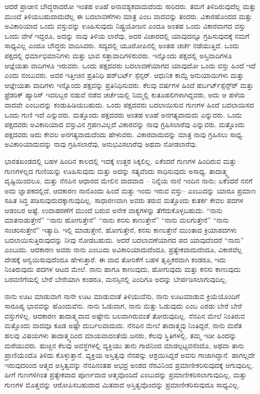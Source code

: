 ಆದರೆ ಪ್ರಾಚೀನ ಬೌದ್ಧರಾದರೋ ಇಂತಹ ಊಹೆ ಅನಾವಶ್ಯಕವಾದುದೆಂದು ಸಾರಿದರು. ತಮಗೆ ತಿಳಿದಿರುವುದೆಲ್ಲ ಮತ್ತು ಮುಂದೆ ತಿಳಿಯಬಹುದಾದುದೆಲ್ಲ ಈ ಬದಲಾವಣೆಗಳು ಮಾತ್ರ ಎಂಬ ವಾದವನ್ನು ತಂದರು. ವಿಕಾರಹೊಂದದ ಮತ್ತು ಅವಿಕಾರಿಯಾದ ಒಂದು ವಸ್ತುವನ್ನು ಊಹಿಸುವುದು ನಿಷ್ಟ್ರಯೋಜನ ಎಂದೂ ಅಂತಹ ಒಂದು ವಿಕಾರವಾಗದ ವಸ್ತು ಒಂದು ವೇಳೆ ಇದ್ದರೂ, ಅದನ್ನು ನಾವು ತಿಳಿಯ ಲಾರೆವು, ಅದರ ವಿಚಾರದಲ್ಲಿ ಯಾವುದನ್ನೂ ಗ್ರಹಿಸುವುದಕ್ಕೆ ನಮಗೆ ಸಾಧ್ಯವಿಲ್ಲ ಎಂದೂ ಬೌದ್ಧರು ವಾದಿಸಿದರು. ಸದ್ಯದಲ್ಲಿ ಯೂರೋಪಿನಲ್ಲಿ ಅಂತಹ ಚರ್ಚೆ ನಡೆಯುತ್ತಿದೆ. ಒಂದು ಪಕ್ಷದಲ್ಲಿ ಧರ್ಮಾಭಿಮಾನಿಗಳು ಮತ್ತು ಭಾವ ಸತ್ತಾವಾದಿಗಳಿರುವರು. ಇನ್ನೊಂದು ಪಕ್ಷದಲ್ಲಿ ಅಸ್ತಿವಾದಿಗಳೂ ಆಜ್ಞೆಯತಾ ವಾದಿಗಳೂ ಇರುವರು. ಒಂದು ಪಕ್ಷದವರು ಬದಲಾವಣೆಯಾಗದ ಯಾವುದೋ ಒಂದು ವಸ್ತು ಹಿಂದೆ ಇದೆ ಎಂದು ನಂಬುವರು. ಅವರ ಇತ್ತೀಚಿನ ಪ್ರತಿನಿಧಿ ಹರ್​ಬರ್ಟ್​ ಸ್ಪೆನ್ಸರ್​. ಆಧುನಿಕ ಕಾಮ್ಟೆ ಅನುಯಾಯಿಗಳು ಮತ್ತು ಆಜ್ಞೇಯತಾ ವಾದಿಗಳು ಇನ್ನೊಂದು ಪಕ್ಷವನ್ನು ಪ್ರತಿನಿಧಿಸುವರು. ಕೆಲವು ವರ್ಷಗಳ ಹಿಂದೆ ಹರ್ಬರ್ಟ್​ ಸ್ಪೆನ್ಸ್​ರ್​ ಮತ್ತು ಫ್ರೆಡರಿಕ್​ ಹ್ಯಾರಿಸ್​ ಇವರಿಬ್ಬರ ನಡುವೆ ನಡೆದ ಚರ್ಚೆಯಲ್ಲಿ ನಿಮ್ಮಲ್ಲಿ ಕುತೂಹಲಿಗಳಾಗಿದ್ದವರು, ಅದು ಆ ಹಳೆಯ ವಾದವೇ ಎಂಬುದನ್ನು ಕಂಡುಹಿಡಿಯಬಹುದು. ಒಂದು ಪಕ್ಷದವರು ಬದಲಾಯಿಸುವ ಗುಣಗಳ ಹಿಂದೆ ಬದಲಾಯಿಸದ ಒಂದು ಗುಣಿ ಇದೆ ಎನ್ನುವರು. ಮತ್ತೊಂದು ಪಕ್ಷದವರು ಅಂತಹ ಊಹೆ ಅನಗತ್ಯವಾದುದು ಎನ್ನುವರು. ಒಂದು ಪಕ್ಷದವರು ಅವಿಕಾರಿಯಾದ ವಸ್ತುವಿನ ಗ್ರಹಣವಿಲ್ಲದೆ ವಿಕಾರವನ್ನು ನಾವು ಗ್ರಹಿಸಲಾರೆವು ಎನ್ನುವರು. ಮತ್ತೊಂದು ಪಕ್ಷದವರು ಅದು ಕೇವಲ ಅನಗತ್ಯವಾದುದೆಂದು ಹೇಳುವರು. ವಿಕಾರವಾದುದನ್ನು ಮಾತ್ರ ನಾವು ಗ್ರಹಿಸಲು ಸಾಧ್ಯ. ಅವಿಕಾರಿಯಾದುದನ್ನು ನಾವು ಗ್ರಹಿಸಲಾರೆವು, ಅನುಭವಿಸಲಾರೆವು ಅಥವಾ ನೋಡಲಾರೆವು.

ಭಾರತಖಂಡದಲ್ಲಿ ಬಹಳ ಹಿಂದಿನ ಕಾಲದಲ್ಲಿ ಇದಕ್ಕೆ ಉತ್ತರ ಸಿಕ್ಕಲಿಲ್ಲ. ಏಕೆಂದರೆ ಗುಣಗಳ ಹಿಂದಿರುವ ಮತ್ತು ಗುಣಗಳಲ್ಲದ ಗುಣಿಯನ್ನು ಊಹಿಸುವುದು ಮತ್ತು ಅದನ್ನು ಸತ್ಯವೆಂದು ಸಾಧಿಸುವುದು ಅಸಾಧ್ಯ. ತಾದಾತ್ಮ್ಯ ದೃಷ್ಟಿಯಿಂದಲೂ, ಮತ್ತು ನೆನಪಿನ ಆಧಾರದ ಮೇಲಿನ ವಾದವಾದ – ನಿನ್ನೆಯ ನಾನೆ ಇಂದಿನ ನಾನು; ಏಕೆಂದರೆ ನನಗೆ ಅದು ಜ್ಞಾಪಕದಲ್ಲಿದೆ, ಆದಕಾರಣ ನಾನೊಂದು ಹಿಂದೆ ಮತ್ತು ಇಂದು ಇರುವ ವಸ್ತು– ಎಂಬುದನ್ನು ಯಾರೂ ಪ್ರಮಾಣ ಸಹಿತ ಸಿದ್ಧ ಪಡಿಸುವುದುದಕ್ಕಾಗುವುದಿಲ್ಲ. ಸಾಧಾರಣವಾಗಿ ಅವರು ತರುವ ಮತ್ತೊಂದು ಕುತರ್ಕ ಕೇವಲ ಪದಗಳ ಆಡಂಬರ ಅಷ್ಟೆ. ಉದಾಹರಣೆಗೆ ಮುಂದೆ ಬರುವ ಅನೇಕ ವಾಕ್ಯಗಳನ್ನು ತೆಗೆದುಕೊಳ್ಳಬಹುದು. “ನಾನು ಮಾತನಾಡುತ್ತೇನೆ” “ನಾನು ಹೋಗುತ್ತೇನೆ” “ನಾನು ಕನಸು ಕಾಣುತ್ತೇನೆ” “ನಾನು ಮಲಗುತ್ತೇನೆ” “ನಾನು ಸಂಚರಿಸುತ್ತೇನೆ” ಇತ್ಯಾದಿ. ಇಲ್ಲಿ ಮಾಡುತ್ತೇನೆ, ಹೋಗುತ್ತೇನೆ, ಕನಸು ಕಾಣುತ್ತೇನೆ ಮುಂತಾದ ಕ್ರಿಯಾಪದಗಳು ಬದಲಾಯಿಸುತ್ತಿರುವುದನ್ನು ನೀವು ನೋಡಬಹುದು. ಆದರೆ ಬದಲಾವಣೆಯಾಗದ ಪದ ಯಾವುದೆಂದರೆ “ನಾನು” ಎಂಬುದು. ಆದಕಾರಣ ಅವರು ನಾನು ಎಂಬುದು ಅವಿಕಾರಿಯಾದುದೆಂದೂ, ಪ್ರತ್ಯೇಕವಾದುದೆಂದೂ, ವಿಕಾರವೆಲ್ಲ ದೇಹಕ್ಕೆ ಅನ್ವಯಿಸುವುದೆಂದೂ ಹೇಳುತ್ತಾರೆ. ಈ ವಾದ ತೋರಿಕೆಗೆ ಬಹಳ ತೃಪ್ತಿಕರವಾಗಿ ಕಂಡರೂ, ಇದು ನಿಂತಿರುವುದು ಪದಗಳ ಆಟದ ಮೇಲೆ. ನಾನು ಹಾಗೂ ಕಾಣುವುದು, ಹೋಗುವುದು ಮತ್ತು ಕನಸು ಕಾಣುವುದು ಬರವಣಿಗೆಯಲ್ಲಿ ಬೇರೆ ಬೇರೆಯಾಗಿ ಕಂಡರೂ, ಮನಸ್ಸಿನಲ್ಲಿ ಎಂದಿಗೂ ಅದನ್ನು ಬೇರ್ಪಡಿಸಲಾಗುವುದಿಲ್ಲ.

ನಾನು ಊಟ ಮಾಡುವಾಗ ನಾನೇ ಊಟ ಮಾಡುವಂತೆ ತಿಳಿಯುವೆನು, ನಾನು ಊಟಮಾಡುವ ಕ್ರಿಯೆಯೊಂದಿಗೆ ಸಾರೂಪ್ಯ ಭಾವವನ್ನು ಹೊಂದುವೆನು. ನಾನು ಓಡುವಾಗ, ನಾನು ಮತ್ತು ಓಡುವುದು ಎಂಬ ಎರಡು ಬೇರೆ ಬೇರೆ ವಸ್ತುಗಳಿಲ್ಲ. ಆದಕಾರಣ ತಾದಾತ್ಮ್ಯವಾದ ಅಷ್ಟೇನು ಬಲವಾಗಿರುವಂತೆ ತೋರುವುದಿಲ್ಲ. ನೆನಪಿನ ಮೇಲೆ ನಿಂತಿರುವ ಮತ್ತೊಂದು ವಾದವೂ ಕೂಡ ಅಷ್ಟೇ ದುರ್ಬಲವಾದುದು. ನೆನಪಿನ ಮೇಲೆ ತಾದಾತ್ಮ್ಯವು ನಿಂತಿದ್ದರೆ, ನಾನು ಮರೆತ ಹಲವು ವಿಷಯಗಳು ತಾದಾತ್ಮ್ಯದಿಂದ ಮಾಯವಾದಂತೆಯೆ.ಜನರು, ಕೆಲವು ಸ್ಥಿತಿಗಳಲ್ಲಿ, ತಮ್ಮ ಇಡೀ ಹಿಂದನ್ನು ಮರೆಯುವರು. ಹುಚ್ಚಿನ ಕೆಲವು ಅವಸ್ಥೆಗಳಲ್ಲಿ ವ್ಯಕ್ತಿಯು ತಾನು ಗಾಜಿನಿಂದ ಮಾಡಲ್ಪಟ್ಟವನೆಂದೊ, ಅಥವಾ ತಾನು ಪ್ರಾಣಿಯೆಂದೊ ತಿಳಿದು ಕೊಳ್ಳುತ್ತಾನೆ. ವ್ಯಕ್ತಿಯ ಅಸ್ತಿತ್ವವು ನೆನಪನ್ನು ಆಶ್ರಯಿಸಿದ್ದರೆ ಅವನು ಗಾಜಾಗಿದ್ದಾನೆ. ಹಾಗಲ್ಲದೇ ಇರುವುದರಿಂದ ಆತ್ಮದ ಅಸ್ತಿತ್ವವನ್ನು ನೆನಪಿನಂತಹ ಅಭದ್ರ ಅಂಶದ ನೆರವಿನಿಂದ ಪ್ರಮಾಣೀಕರಿಸುವುದಕ್ಕೆ ಆಗುವುದಿಲ್ಲ. ಹೀಗೆ ಗುಣಗಳಿಗಿಂತ ಪ್ರತ್ಯೇಕವಾದ ಪೂರ್ಣವಾದ ಆತ್ಮವೊಂದಿದೆ ಎಂಬುದನ್ನು ಪ್ರಮಾಣೀಕರಿಸಲಾಗುವುದಿಲ್ಲ, ಮತ್ತು ಗುಣಗಳ ಮೊತ್ತವನ್ನು ಆರೋಪಿಸಬಹುದಾದ ಮಿತವಾದ ಅಸ್ತಿತ್ವವೊಂದನ್ನು ಪ್ರಮಾಣೀಕರಿಸುವುದೂ ಸಾಧ್ಯವಿಲ್ಲ.

